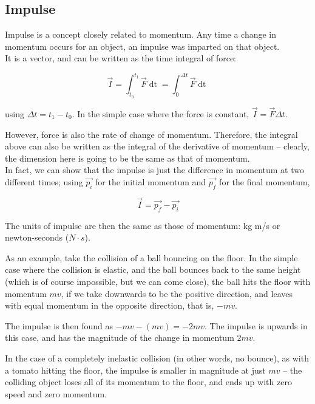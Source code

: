 \subsection{Impulse}

Impulse is a concept closely related to momentum. Any time a change in momentum occurs for an object, an impulse was imparted on that object.\\
It is a vector, and can be written as the time integral of force:

\begin{equation}
\vec{I} = \int_{t_0}^{t_1} \vec{F} \mathop{dt} = \int_0^{\Delta t} \vec{F} \mathop{dt}
\end{equation}

using $\Delta t = t_1 - t_0$. In the simple case where the force is constant, $\vec{I} = \vec{F} \Delta t$.

However, force is also the rate of change of momentum. Therefore, the integral above can also be written as the integral of the derivative of momentum -- clearly, the dimension here is going to be the same as that of momentum.\\
In fact, we can show that the impulse is just the difference in momentum at two different times; using $\vec{p_i}$ for the initial momentum and $\vec{p_f}$ for the final momentum, 

\begin{equation}
\vec{I} = \vec{p_f} - \vec{p_i}
\end{equation}

The units of impulse are then the same as those of momentum: kg m/s or newton-seconds ($N \cdot s$).

As an example, take the collision of a ball bouncing on the floor. In the simple case where the collision is elastic, and the ball bounces back to the same height (which is of course impossible, but we can come close), the ball hits the floor with momentum $m v$, if we take downwards to be the positive direction, and leaves with equal momentum in the opposite direction, that is, $- m v$.

The impulse is then found as $- mv - (mv) = - 2 m v$. The impulse is upwards in this case, and has the magnitude of the change in momentum $2 m v$.

In the case of a completely inelastic collision (in other words, no bounce), as with a tomato hitting the floor, the impulse is smaller in magnitude at just $m v$ -- the colliding object loses all of its momentum to the floor, and ends up with zero speed and zero momentum.


